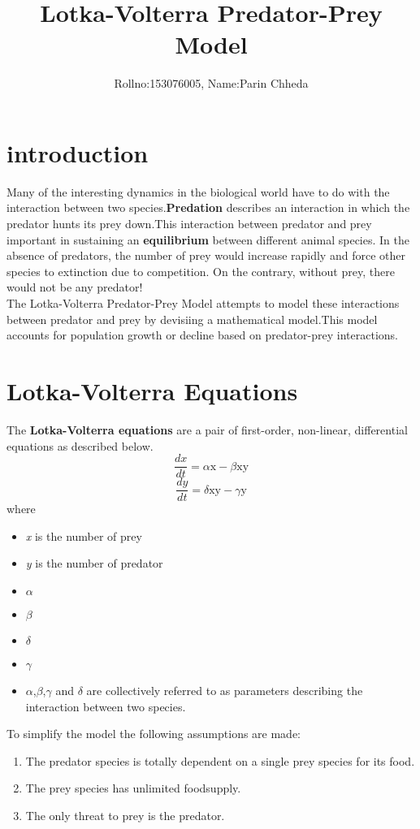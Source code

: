 \documentclass[12pt,a4paper]{article}
\title{Lotka-Volterra Predator-Prey Model}
\author{Rollno:153076005, Name:Parin Chheda}
\begin{document}
	\maketitle
	\section*{introduction}
	Many of the interesting dynamics in the biological world have to do with the interaction between two species.\textbf{Predation} describes an interaction in which the predator hunts its prey down.This interaction between predator and prey important in sustaining an \textbf{equilibrium} between different animal species. In the absence of predators, the number of prey would increase rapidly and force other species to extinction due to competition. On the contrary, without prey, there would not be any predator!\cite{AmritaUniversity}
	\\
	\newline The Lotka-Volterra Predator-Prey Model attempts to model these interactions between predator and prey by devisiing a mathematical model.This model accounts for population growth or decline based on predator-prey interactions.
	\section{Lotka-Volterra Equations}
	The \textbf{Lotka-Volterra equations} are a pair of first-order, non-linear, differential equations as described below.
	\begin{equation}
	\frac{dx}{dt}=\alpha\text{x} - \beta\text{xy}
	\end{equation}
	\begin{equation}
	\frac{dy}{dt}=\delta\text{xy} - \gamma\text{y}
	\end{equation}
	where
	\begin{itemize}
		\item \emph{x} is the number of prey
		\item \emph{y} is the number of predator
		\item $\alpha$  
		\item $\beta$  
		\item $\delta$  
		\item $\gamma$  
		\item $\alpha$,$\beta$,$\gamma$ and $\delta$ are collectively referred to as parameters describing the interaction between two species.
	\end{itemize}
	To simplify the model the following assumptions are made:
	\begin{enumerate}
		\item The predator species is totally dependent on a single prey species for its food.
		\item The prey species has unlimited foodsupply.
		\item The only threat to prey is the predator.
	\end{enumerate}
\end{document}
